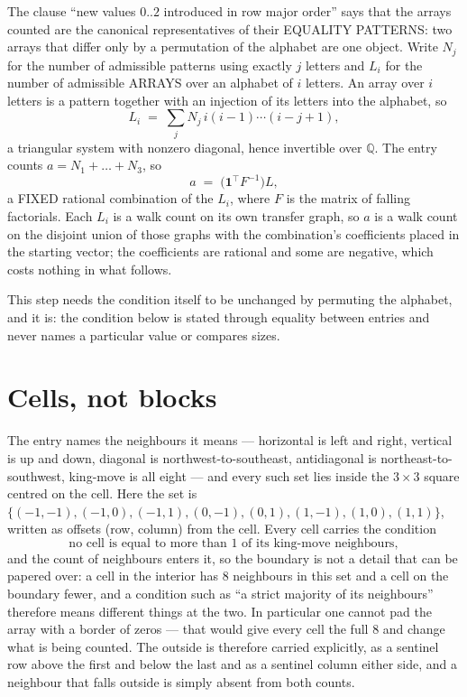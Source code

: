 \documentclass[11pt,a4paper]{article}
\theoremstyle{plain}
\theoremstyle{definition}
\begin{document}
The clause ``new values $0..2$ introduced in row major order'' says that the arrays
counted are the canonical representatives of their EQUALITY PATTERNS: two arrays that differ
only by a permutation of the alphabet are one object. Write $N_j$ for the number of admissible
patterns using exactly $j$ letters and $L_i$ for the number of admissible ARRAYS over an
alphabet of $i$ letters. An array over $i$ letters is a pattern together with an injection of
its letters into the alphabet, so
\[
L_i\;=\;\sum_{j}N_j\,i(i-1)\cdots(i-j+1),
\]
a triangular system with nonzero diagonal, hence invertible over $\mathbb{Q}$. The entry
counts $a=N_1+\dots+N_{3}$, so
\[
a\;=\;\bigl(\mathbf{1}^{\!\top}F^{-1}\bigr)L ,
\]
a FIXED rational combination of the $L_i$, where $F$ is the matrix of falling factorials.
Each $L_i$ is a walk count on its own transfer graph, so $a$ is a walk count on the disjoint
union of those graphs with the combination's coefficients placed in the starting vector; the
coefficients are rational and some are negative, which costs nothing in what follows.

This step needs the condition itself to be unchanged by permuting the alphabet, and it is:
the condition below is stated through equality between entries and never names a particular
value or compares sizes.

\section{Cells, not blocks}

The entry names the neighbours it means --- horizontal is left and right, vertical is up and
down, diagonal is northwest-to-southeast, antidiagonal is northeast-to-southwest, king-move is
all eight --- and every such set lies inside the $3\times3$ square centred on the cell. Here
the set is $\{(-1,-1), (-1,0), (-1,1), (0,-1), (0,1), (1,-1), (1,0), (1,1)\}$, written as offsets (row, column) from the cell. Every cell carries
the condition
\[
\text{no cell is equal to more than 1 of its king-move neighbours},
\]
and the count of neighbours enters it, so the boundary is not a detail that can be papered
over: a cell in the interior has $8$ neighbours in this set and a cell on the boundary
fewer, and a condition such as ``a strict majority of its neighbours'' therefore means
different things at the two. In particular one cannot pad the array with a border of zeros ---
that would give every cell the full $8$ and change what is being counted. The outside is
therefore carried
explicitly, as a sentinel row above the first and below the last and as a sentinel column
either side, and a neighbour that falls outside is simply absent from both counts.
\end{document}
